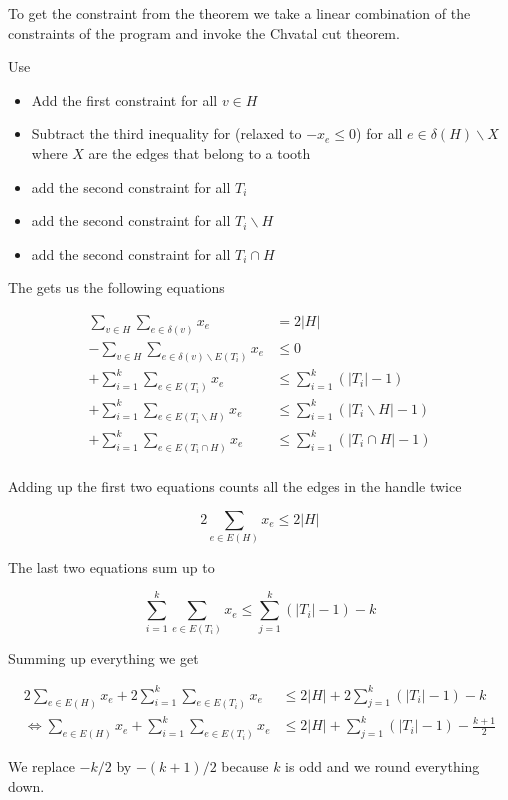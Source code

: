 \begin{pr} To get the constraint from the theorem we take a linear combination of the constraints of the program and invoke the Chvatal cut theorem.

Use

\begin{itemize}
\item Add the first constraint for all $v\in H$
\item Subtract the third inequality for (relaxed to $-x_e\leq 0$) for all $e\in \delta(H)\backslash X$ where $X$ are the edges that belong to a tooth
\item add the second constraint for all $T_i$
\item add the second constraint for all $T_i\backslash H$
\item add the second constraint for all $T_i \cap H$
\end{itemize}

The gets us the following equations

\begin{align*}
\sum_{v\in H}\sum_{e\in \delta(v)} x_e&=2|H|\\
-\sum_{v\in H} \sum_{e\in \delta(v) \backslash E(T_i)} x_e & \leq 0\\
+\sum_{i=1}^k \sum_{e\in E(T_i)} x_e &\leq \sum_{i=1}^k(|T_i|-1)\\
+\sum_{i=1}^k \sum_{e\in E(T_i\backslash H)} x_e &\leq \sum_{i=1}^k(|T_i\backslash H|-1)\\
+\sum_{i=1}^k \sum_{e\in E(T_i\cap H)} x_e &\leq \sum_{i=1}^k(|T_i\cap H|-1)\\
\end{align*}

Adding up the first two equations counts all the edges in the handle twice

\[2\sum_{e\in E(H)} x_e \leq 2|H|\]

The last two equations sum up to

\[\sum_{i=1}^k \sum_{e\in E(T_i)} x_e \leq \sum_{j=1}^k (|T_i|-1) -k\]

Summing up everything we get

\begin{align*}
2\sum_{e\in E(H)} x_e + 2\sum_{i=1}^k \sum_{e\in E(T_i)} x_e &\leq 2|H| + 2\sum_{j=1}^k (|T_i|-1) -k\\
\Leftrightarrow \sum_{e\in E(H)} x_e + \sum_{i=1}^k \sum_{e\in E(T_i)} x_e &\leq 2|H| + \sum_{j=1}^k (|T_i|-1) -\frac{k+1}{2}
\end{align*}

We replace $-k/2$ by $-(k+1)/2$ because $k$ is odd and we round everything down.
\end{pr}


